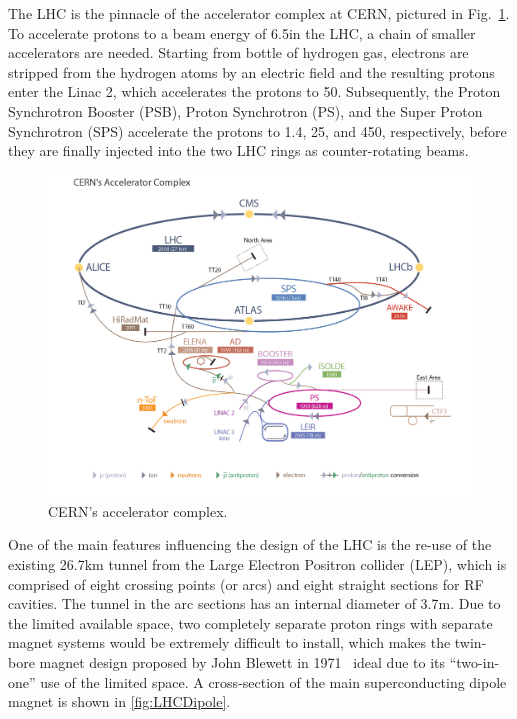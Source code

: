 The LHC is the pinnacle of the accelerator
complex at CERN, pictured in Fig.~\ref{fig:LHCComplex}.  To accelerate
protons to a beam energy of 6.5\TeV in the LHC, a chain of smaller
accelerators are needed. Starting from bottle of hydrogen gas,
electrons are stripped from the hydrogen atoms by an electric field
and the resulting protons enter the Linac 2, which accelerates the
protons to 50\MeV. Subsequently, the Proton Synchrotron Booster (PSB), Proton Synchrotron (PS), and the
Super Proton Synchrotron (SPS) accelerate the protons to 1.4\GeV, 25\GeV, and 450\GeV, respectively, before they are finally injected
into the two LHC rings as counter-rotating beams.

\begin{figure}\centering
\includegraphics[width=.9\textwidth]{figs/cms/LHC_default.jpg}
\caption{CERN's accelerator complex.\label{fig:LHCComplex}}
\end{figure}

One of the main features influencing the design of the LHC is the re-use of the
existing 26.7\unit{km} tunnel from the Large Electron Positron collider (LEP), which is
comprised of eight crossing points (or arcs) and eight straight sections for
RF cavities. The tunnel in the arc sections has an internal diameter of 3.7\unit{m}. Due to the limited available space, two completely separate
proton rings with separate magnet systems would be extremely difficult to install, which makes the twin-bore magnet design proposed by John
Blewett in 1971~\cite{Blewett:1068131} ideal due to its
``two-in-one'' use of the limited space. A cross-section of the main superconducting
dipole magnet is shown in \ref{fig:LHCDipole}.

